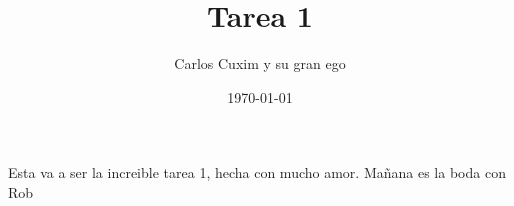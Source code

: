 \documentclass[11pt]{article}
\title{Tarea 1}
\author{Carlos Cuxim y su gran ego}
\date{\today}
\begin{document}
\maketitle

Esta va a ser la increible tarea 1, hecha con mucho amor.
Mañana es la boda con Rob
\end{document}
